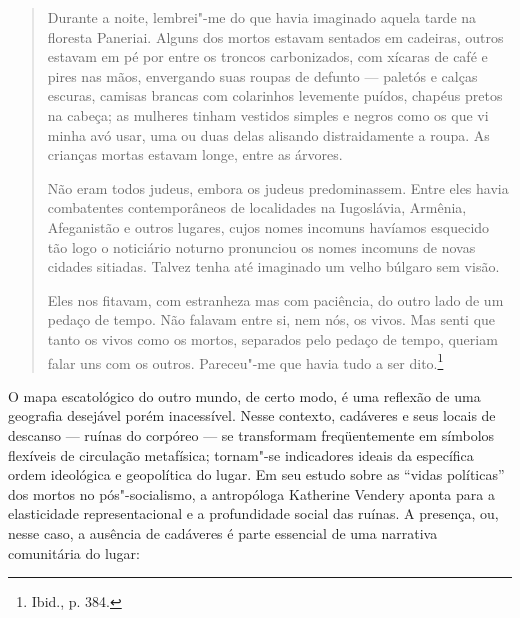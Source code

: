 \begin{quote}
Durante a noite, lembrei"-me do que havia imaginado aquela tarde na
floresta Paneriai. Alguns dos mortos estavam sentados em cadeiras,
outros estavam em pé por entre os troncos carbonizados, com xícaras de
café e pires nas mãos, envergando suas roupas de defunto --- paletós e
calças escuras, camisas brancas com colarinhos levemente puídos, chapéus
pretos na cabeça; as mulheres tinham vestidos simples e negros como os
que vi minha avó usar, uma ou duas delas alisando distraidamente a
roupa. As crianças mortas estavam longe, entre as árvores.

Não eram todos judeus, embora os judeus predominassem. Entre eles havia
combatentes contemporâneos de localidades na Iugoslávia, Armênia,
Afeganistão e outros lugares, cujos nomes incomuns havíamos esquecido
tão logo o noticiário noturno pronunciou os nomes incomuns de novas
cidades sitiadas. Talvez tenha até imaginado um velho búlgaro sem visão.

Eles nos fitavam, com estranheza mas com paciência, do outro lado de um
pedaço de tempo. Não falavam entre si, nem nós, os vivos. Mas senti que
tanto os vivos como os mortos, separados pelo pedaço de tempo, queriam
falar uns com os outros. Pareceu"-me que havia tudo a ser dito.\footnote{Ibid.,
  p. 384.}
\end{quote}

O mapa escatológico do outro mundo, de certo modo, é uma reflexão de uma
geografia desejável porém inacessível. Nesse contexto, cadáveres e seus
locais de descanso --- ruínas do corpóreo --- se transformam freqüentemente
em símbolos flexíveis de circulação metafísica; tornam"-se indicadores
ideais da específica ordem ideológica e geopolítica do lugar. Em seu
estudo sobre as ``vidas políticas'' dos mortos no pós"-socialismo, a
antropóloga Katherine Vendery aponta para a elasticidade
representacional e a profundidade social das ruínas. A presença, ou,
nesse caso, a ausência de cadáveres é parte essencial de uma narrativa
comunitária do lugar:

